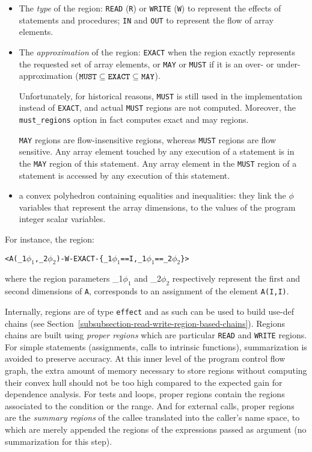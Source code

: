 \documentclass[a4paper]{report}
\newcommand{\exact}[0]{{\tt EXACT}}
\newcommand{\incluseg}{\subseteq}
\newcommand{\phik}[1]{\ifmmode\phi_{#1}\else$\phi_{#1}$\fi}
\newcommand{\must}[0]{{\tt MUST}}
\newcommand{\may}[0]{{\tt MAY}}
\begin{document}
\begin{itemize}
\item The {\em type\/} of the region: \verb+READ+ (\verb+R+) or \verb+WRITE+
(\verb+W+) to represent the effects of statements and procedures; \verb+IN+
and \verb+OUT+ to represent the flow of array elements.

\item The {\em approximation\/} of the region: \verb+EXACT+ when the region
  exactly represents the requested set of array elements, or \verb+MAY+ or
  \verb+MUST+ if it is an over- or under-approximation ($\text{\must}
  \incluseg \text{\exact} \incluseg \text{\may}$).

  Unfortunately, for historical reasons, \verb+MUST+ is still used in the
  implementation instead of \verb+EXACT+, and actual \verb+MUST+ regions are
  not computed. Moreover, the {\tt must\_regions} option in fact computes
  exact and may regions.
 
  \verb+MAY+ regions are flow-insensitive regions, whereas \verb+MUST+
  regions are flow sensitive. Any array element touched by any execution of
  a statement is in the \verb+MAY+ region of this statement. Any array
  element in the \verb+MUST+ region of a statement is accessed by any
  execution of this statement. 

\item  a convex polyhedron containing equalities and inequalities:
  they link the $\phi$ variables that represent the array dimensions,
  to the values of the program integer scalar variables. 
\end{itemize}
 
For instance, the region:
\begin{alltt}
  \begin{center}
  <A(\phik{1},\phik{2})-W-EXACT-\{\phik{1}==I, \phik{1}==\phik{2}\}>
\end{center}
\end{alltt}
where the region parameters \phik{1} and \phik{2} respectively represent
the first and second dimensions of \verb+A+, corresponds to an assignment
of the element \verb+A(I,I)+.


Internally, regions are of type \texttt{effect} and as such can be used to build
use-def chains (see
Section~\ref{subsubsection-read-write-region-based-chains}). Regions
chains are built using {\em proper regions} which are particular
\verb+READ+ and \verb+WRITE+ regions. For simple statements (assignments,
calls to intrinsic functions), summarization is avoided to preserve
accuracy. At this inner level of the program control flow graph, the extra
amount of memory necessary to store regions without computing their convex
hull should not be too high compared to the expected gain for dependence
analysis. For tests and loops, proper regions contain the regions associated
to the condition or the range. And for external calls, proper regions
are the {\em summary regions} of the callee translated into the caller's name
space, to which are merely appended the regions of the expressions
passed as argument (no summarization for this step).
\end{document}
